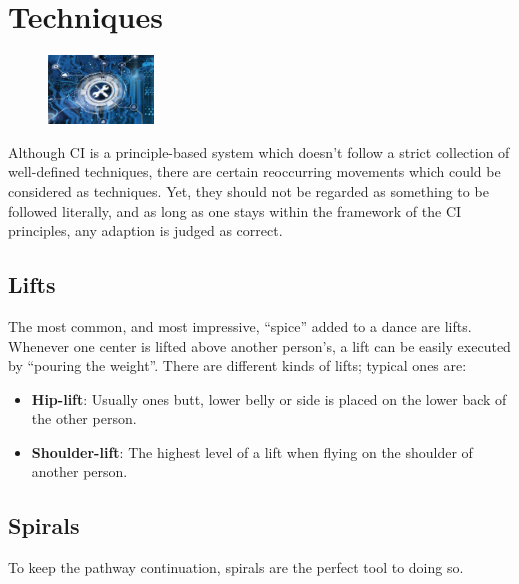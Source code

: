 \section{Techniques}\label{sec:techniques}

\begin{figure}
    \centering
    \includegraphics[width=0.25\textwidth]{images/techniques}
\end{figure}

Although CI is a principle-based system which doesn't follow a strict collection of well-defined techniques, there are certain reoccurring movements which could be considered as techniques.
Yet, they should not be regarded as something to be followed literally, and as long as one stays within the framework of the CI principles, any adaption is judged as correct.

\subsection{Lifts}\label{subsec:lifts}

The most common, and most impressive, ``spice'' added to a dance are lifts.
Whenever one center is lifted above another person's, a lift can be easily executed by ``pouring the weight''.
There are different kinds of lifts; typical ones are:

\begin{itemize}
    \item \textbf{Hip-lift}: Usually ones butt, lower belly or side is placed on the lower back of the other person.
    \item \textbf{Shoulder-lift}: The highest level of a lift when flying on the shoulder of another person.
\end{itemize}

\subsection{Spirals}\label{subsec:spirals}

To keep the pathway continuation, spirals are the perfect tool to doing so.
